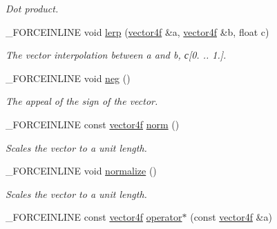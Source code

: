 \begin{DoxyCompactItemize}
\begin{DoxyCompactList}\small\item\em Dot product. \end{DoxyCompactList}\item 
\hypertarget{classbt_1_1vector4f_a00fd24489e1d9bdce71778fdc4600bf0}{\-\_\-\-F\-O\-R\-C\-E\-I\-N\-L\-I\-N\-E void \hyperlink{classbt_1_1vector4f_a00fd24489e1d9bdce71778fdc4600bf0}{lerp} (\hyperlink{classbt_1_1vector4f}{vector4f} \&a, \hyperlink{classbt_1_1vector4f}{vector4f} \&b, float c)}\label{classbt_1_1vector4f_a00fd24489e1d9bdce71778fdc4600bf0}

\begin{DoxyCompactList}\small\item\em The vector interpolation between a and b, с\mbox{[}0. .. 1.\mbox{]}. \end{DoxyCompactList}\item 
\hypertarget{classbt_1_1vector4f_a38063f2e4b8e35fe5fbda7e7529fc1d3}{\-\_\-\-F\-O\-R\-C\-E\-I\-N\-L\-I\-N\-E void \hyperlink{classbt_1_1vector4f_a38063f2e4b8e35fe5fbda7e7529fc1d3}{neg} ()}\label{classbt_1_1vector4f_a38063f2e4b8e35fe5fbda7e7529fc1d3}

\begin{DoxyCompactList}\small\item\em The appeal of the sign of the vector. \end{DoxyCompactList}\item 
\hypertarget{classbt_1_1vector4f_a70b20cd9720ecc5dfd6e3273c3cdfbad}{\-\_\-\-F\-O\-R\-C\-E\-I\-N\-L\-I\-N\-E const \hyperlink{classbt_1_1vector4f}{vector4f} \hyperlink{classbt_1_1vector4f_a70b20cd9720ecc5dfd6e3273c3cdfbad}{norm} ()}\label{classbt_1_1vector4f_a70b20cd9720ecc5dfd6e3273c3cdfbad}

\begin{DoxyCompactList}\small\item\em Scales the vector to a unit length. \end{DoxyCompactList}\item 
\hypertarget{classbt_1_1vector4f_aa8e01cd084218cbe2ee136708b1499f6}{\-\_\-\-F\-O\-R\-C\-E\-I\-N\-L\-I\-N\-E void \hyperlink{classbt_1_1vector4f_aa8e01cd084218cbe2ee136708b1499f6}{normalize} ()}\label{classbt_1_1vector4f_aa8e01cd084218cbe2ee136708b1499f6}

\begin{DoxyCompactList}\small\item\em Scales the vector to a unit length. \end{DoxyCompactList}\item 
\hypertarget{classbt_1_1vector4f_ab525b4b33f6b518b7b22954b05a3ebb3}{\-\_\-\-F\-O\-R\-C\-E\-I\-N\-L\-I\-N\-E const \hyperlink{classbt_1_1vector4f}{vector4f} \hyperlink{classbt_1_1vector4f_ab525b4b33f6b518b7b22954b05a3ebb3}{operator$\ast$} (const \hyperlink{classbt_1_1vector4f}{vector4f} \&a)}\label{classbt_1_1vector4f_ab525b4b33f6b518b7b22954b05a3ebb3}


\end{DoxyCompactItemize}
